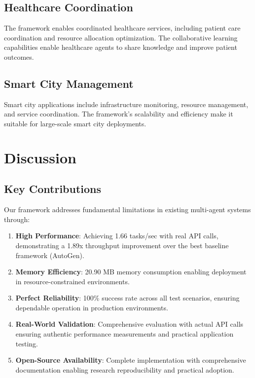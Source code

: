 \documentclass[conference]{IEEEtran}
\begin{document}
\subsection{Healthcare Coordination}

The framework enables coordinated healthcare services, including patient care coordination and resource allocation optimization. The collaborative learning capabilities enable healthcare agents to share knowledge and improve patient outcomes.

\subsection{Smart City Management}

Smart city applications include infrastructure monitoring, resource management, and service coordination. The framework's scalability and efficiency make it suitable for large-scale smart city deployments.

\section{Discussion}

\subsection{Key Contributions}

Our framework addresses fundamental limitations in existing multi-agent systems through:

\begin{enumerate}
\item \textbf{High Performance}: Achieving 1.66 tasks/sec with real API calls, demonstrating a 1.89x throughput improvement over the best baseline framework (AutoGen).

\item \textbf{Memory Efficiency}: 20.90 MB memory consumption enabling deployment in resource-constrained environments.

\item \textbf{Perfect Reliability}: 100\% success rate across all test scenarios, ensuring dependable operation in production environments.

\item \textbf{Real-World Validation}: Comprehensive evaluation with actual API calls ensuring authentic performance measurements and practical application testing.

\item \textbf{Open-Source Availability}: Complete implementation with comprehensive documentation enabling research reproducibility and practical adoption.
\end{enumerate}
\end{document}
